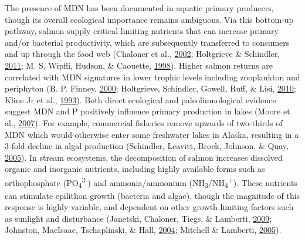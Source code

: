 \documentclass [11pt, proquest] {uwthesis}[2015/03/03]
\begin{document}
The presence of MDN has been documented in aquatic primary producers,
though its overall ecological importance remains ambiguous. Via this
bottom-up pathway, salmon supply critical limiting nutrients that can
increase primary and/or bacterial productivity, which are subsequently
transferred to consumers and up through the food web (Chaloner et al.,
\protect\hyperlink{ref-Chaloner2002}{2002}; Holtgrieve \& Schindler,
\protect\hyperlink{ref-Holtgrieve2011}{2011}; M. S. Wipfli, Hudson, \&
Caouette, \protect\hyperlink{ref-Wipfli1998}{1998}). Higher salmon
returns are correlated with MDN signatures in lower trophic levels
including zooplankton and periphyton (B. P. Finney,
\protect\hyperlink{ref-Finney2000}{2000}; Holtgrieve, Schindler, Gowell,
Ruff, \& Lisi, \protect\hyperlink{ref-Holtgrieve2010}{2010}; Kline Jr et
al., \protect\hyperlink{ref-Kline1993}{1993}). Both direct ecological
and paleolimnological evidence suggest MDN and P positively influence
primary production in lakes (Moore et al.,
\protect\hyperlink{ref-Moore2007}{2007}). For example, commercial
fisheries remove upwards of two-thirds of MDN which would otherwise
enter some freshwater lakes in Alaska, resulting in a 3-fold decline in
algal production (Schindler, Leavitt, Brock, Johnson, \& Quay,
\protect\hyperlink{ref-Schindler2005}{2005}). In stream ecosystems, the
decomposition of salmon increases dissolved organic and inorganic
nutrients, including highly available forms such as orthophosphate
(PO\textsubscript{4}\textsuperscript{3-}) and ammonia/ammonium
(NH\textsubscript{3}/NH\textsubscript{4}\textsuperscript{+}). These
nutrients can stimulate epilithon growth (bacteria and algae), though
the magnitude of this response is highly variable, and dependent on
other growth limiting factors such as sunlight and disturbance
(Janetski, Chaloner, Tiegs, \& Lamberti,
\protect\hyperlink{ref-Janetski2009}{2009}; Johnston, MacIsaac,
Tschaplinski, \& Hall, \protect\hyperlink{ref-Johnston2004}{2004};
Mitchell \& Lamberti, \protect\hyperlink{ref-Mitchell2005}{2005}).
\end{document}
